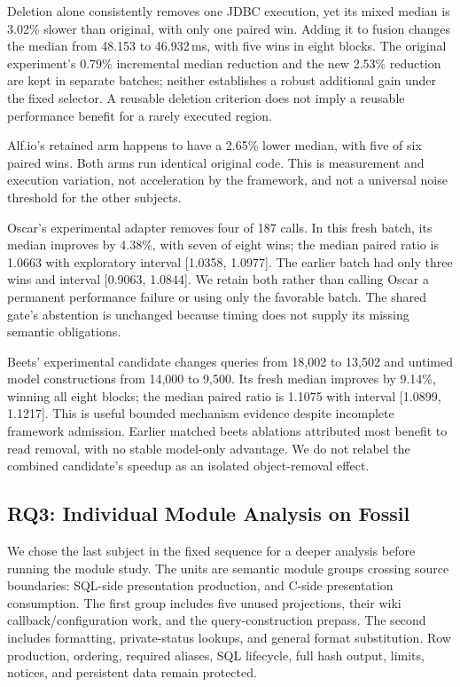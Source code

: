 \documentclass[acmsmall,screen,review,anonymous]{acmart}
\begin{document}
Deletion alone consistently removes one JDBC execution, yet its mixed median
is 3.02\% slower than original, with only one paired win. Adding it to fusion
changes the median from 48.153 to 46.932\,ms, with five wins in eight blocks.
The original experiment's 0.79\% incremental median reduction and the new
2.53\% reduction are kept in separate batches; neither establishes a robust
additional gain under the fixed selector. A reusable deletion criterion does
not imply a reusable performance benefit for a rarely executed region.

Alf.io's retained arm happens to have a 2.65\% lower median, with five of six
paired wins. Both arms run identical original code. This is measurement and
execution variation, not acceleration by the framework, and not a universal
noise threshold for the other subjects.

Oscar's experimental adapter removes four of 187 calls. In this fresh batch,
its median improves by 4.38\%, with seven of eight wins; the median paired
ratio is 1.0663 with exploratory interval [1.0358, 1.0977]. The earlier batch
had only three wins and interval [0.9063, 1.0844]. We retain both rather than
calling Oscar a permanent performance failure or using only the favorable
batch. The shared gate's abstention is unchanged because timing does not
supply its missing semantic obligations.

Beets' experimental candidate changes queries from 18,002 to 13,502 and
untimed model constructions from 14,000 to 9,500. Its fresh median improves
by 9.14\%, winning all eight blocks; the median paired ratio is 1.1075 with
interval [1.0899, 1.1217]. This is useful bounded mechanism evidence despite
incomplete framework admission. Earlier matched beets ablations attributed
most benefit to read removal, with no stable model-only advantage. We do not
relabel the combined candidate's speedup as an isolated object-removal effect.

\subsection{RQ3: Individual Module Analysis on Fossil}
\label{sec:modules}
We chose the last subject in the fixed sequence for a deeper analysis before
running the module study. The units are semantic module groups crossing source
boundaries: SQL-side presentation production, and C-side presentation consumption.
The first group includes five unused projections, their wiki callback/configuration
work, and the query-construction prepass. The second includes formatting,
private-status lookups, and general format substitution. Row production,
ordering, required aliases, SQL lifecycle, full hash output, limits, notices,
and persistent data remain protected.
\end{document}

